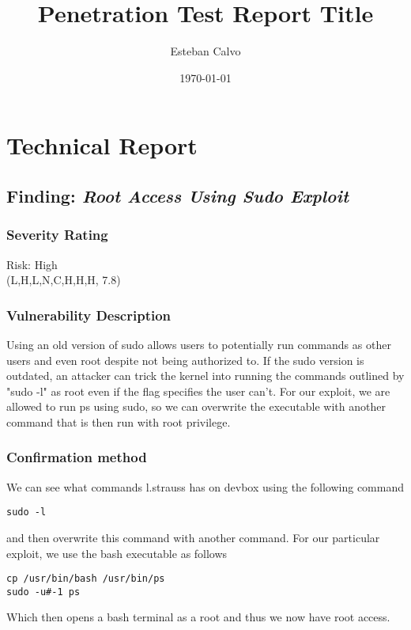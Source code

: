 \documentclass[notitlepage]{article}
\begin{document}
  
\title{Penetration Test Report Title}
\author{Esteban Calvo}
\date{\isodate\today}

\maketitle

\tableofcontents

\newpage
\section{Technical Report}
  \subsection{Finding: \emph{Root Access Using Sudo Exploit}}

	\subsubsection*{Severity Rating}
        Risk: High \\
		\cvss(L,H,L,N,C,H,H,H, 7.8)
		
  	\subsubsection*{Vulnerability Description}
  	Using an old version of sudo allows users to potentially run commands as other users and even root despite not being authorized to. If the sudo version is outdated,
    an attacker can trick the kernel into running the commands outlined by "sudo -l" as root even if the flag specifies the user can't. For our exploit, we are allowed to run ps
    using sudo, so we can overwrite the executable with another command that is then run with root privilege. 
  	\subsubsection*{Confirmation method}
  	We can see what commands l.strauss has on devbox using the following command
\begin{verbatim}
sudo -l
\end{verbatim}
    and then overwrite this command with another command. For our particular exploit, we use the bash executable as follows
\begin{verbatim}
cp /usr/bin/bash /usr/bin/ps
sudo -u#-1 ps
\end{verbatim}
    Which then opens a bash terminal as a root and thus we now have root access. 
\end{document}

